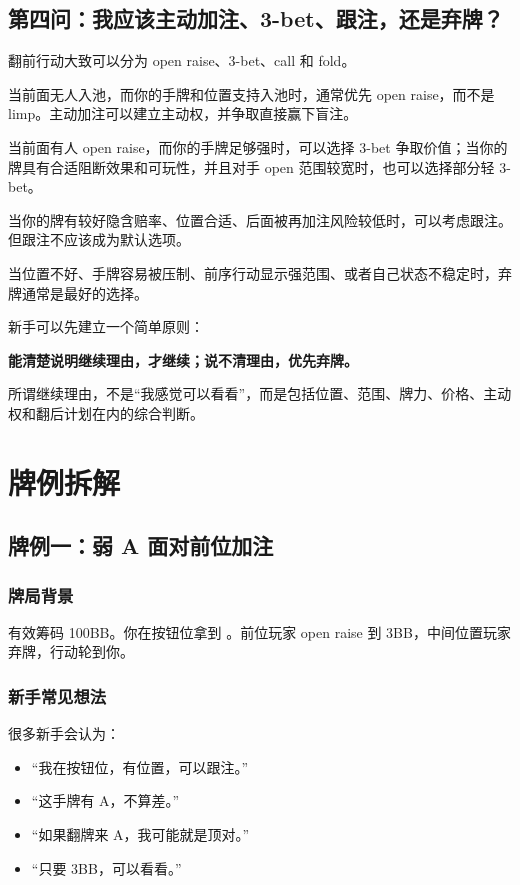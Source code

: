 \subsection{第四问：我应该主动加注、3-bet、跟注，还是弃牌？}

翻前行动大致可以分为 open raise、3-bet、call 和 fold。

当前面无人入池，而你的手牌和位置支持入池时，通常优先 open raise，而不是 limp。主动加注可以建立主动权，并争取直接赢下盲注。

当前面有人 open raise，而你的手牌足够强时，可以选择 3-bet 争取价值；当你的牌具有合适阻断效果和可玩性，并且对手 open 范围较宽时，也可以选择部分轻 3-bet。

当你的牌有较好隐含赔率、位置合适、后面被再加注风险较低时，可以考虑跟注。但跟注不应该成为默认选项。

当位置不好、手牌容易被压制、前序行动显示强范围、或者自己状态不稳定时，弃牌通常是最好的选择。

新手可以先建立一个简单原则：

\begin{center}
\textbf{能清楚说明继续理由，才继续；说不清理由，优先弃牌。}
\end{center}

所谓继续理由，不是“我感觉可以看看”，而是包括位置、范围、牌力、价格、主动权和翻后计划在内的综合判断。

\section{牌例拆解}

\subsection{牌例一：弱 A 面对前位加注}

\subsubsection*{牌局背景}

有效筹码 100BB。你在按钮位拿到 。前位玩家 open raise 到 3BB，中间位置玩家弃牌，行动轮到你。

\subsubsection*{新手常见想法}

很多新手会认为：

\begin{itemize}
\item “我在按钮位，有位置，可以跟注。”
\item “这手牌有 A，不算差。”
\item “如果翻牌来 A，我可能就是顶对。”
\item “只要 3BB，可以看看。”
\end{itemize}

